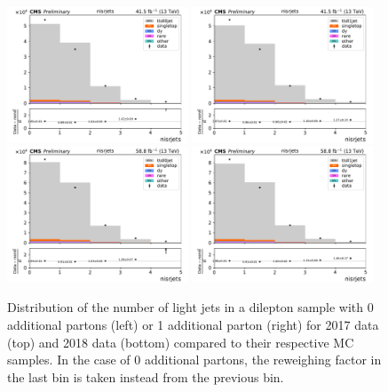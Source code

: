   \begin{figure}[h!]
  \centering
  \includegraphics[width=0.48\textwidth]{figs/ftan/isr/y2017_isrrw_nisrjets0.pdf}
  \includegraphics[width=0.48\textwidth]{figs/ftan/isr/y2017_isrrw_nisrjets1.pdf} \\
  \includegraphics[width=0.48\textwidth]{figs/ftan/isr/y2018_isrrw_nisrjets0.pdf}
  \includegraphics[width=0.48\textwidth]{figs/ftan/isr/y2018_isrrw_nisrjets1.pdf}
  \caption{
      Distribution of the number of light jets in a dilepton \ttbar sample with 0
      additional partons (left) or 1 additional parton (right) for 2017 data
      (top) and 2018 data (bottom) compared to their respective MC samples.
      In the case of 0 additional partons, the reweighing factor in the last bin
      is taken instead from the previous bin.
  }
  \label{fig:isrweight2}
  \end{figure}

